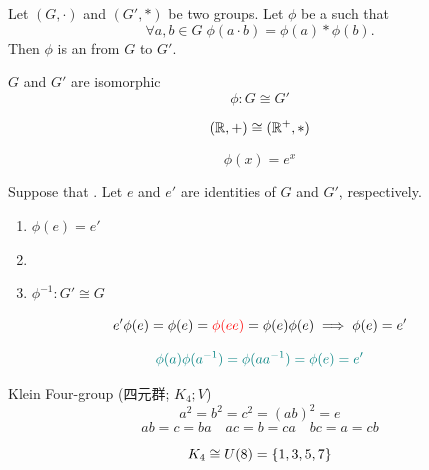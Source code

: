
\begin{frame}
  \begin{definition}[Isomorphism (同构)]
    Let $(G, \cdot)$ and $(G', \ast)$ be two groups.
    Let $\phi$ be a  such that
    \[
      \forall a, b \in G\; \phi(a \cdot b) = \phi(a) \ast \phi(b).
    \]
    Then $\phi$ is an  from $G$ to $G'$.
  \end{definition}

  \pause
  \vspace{0.50cm}
  \begin{center}
    $G$ and $G'$ are isomorphic
    \[
      \phi: G \cong G'
    \]
  \end{center}
\end{frame}

\begin{frame}{}
  \begin{exampleblock}{}
    \[
      (\mathbb{R}, +) \cong (\mathbb{R}^{+}, \ast)
    \]
  \end{exampleblock}

  \pause
  \[
    \phi(x) = e^{x}
  \]
\end{frame}

\begin{frame}{}
  \begin{theorem}
    Suppose that .
    Let $e$ and $e'$ are identities of $G$ and $G'$, respectively.

    \begin{enumerate}[(1)]
      \setlength{\itemsep}{6pt}
      \item $\phi(e) = e'$
      \item {}
      \item $\phi^{-1}: G' \cong G$
    \end{enumerate}
  \end{theorem}

  \pause
  \[
    e' \phi(e) = \phi(e) = \textcolor{red}{\phi(e e)} = \phi(e) \phi(e) \implies \phi(e) = e'
  \]

  \pause
  \[
    \textcolor{teal}{\phi(a) \phi(a^{-1}) = \phi(a a^{-1}) = \phi(e) = e'}
  \]
\end{frame}

\begin{frame}{}
  \begin{exampleblock}{Klein Four-group (四元群; $K_{4}; V$)}
    \[
      a^2 = b^2 = c^2 = (ab)^{2} = e
    \]
    \[
      ab = c = ba \quad ac = b = ca \quad bc = a = cb
    \]

    \pause
    \[
      K_{4} \cong U(8) = \{1, 3, 5, 7\}
    \]
  \end{exampleblock}
\end{frame}
